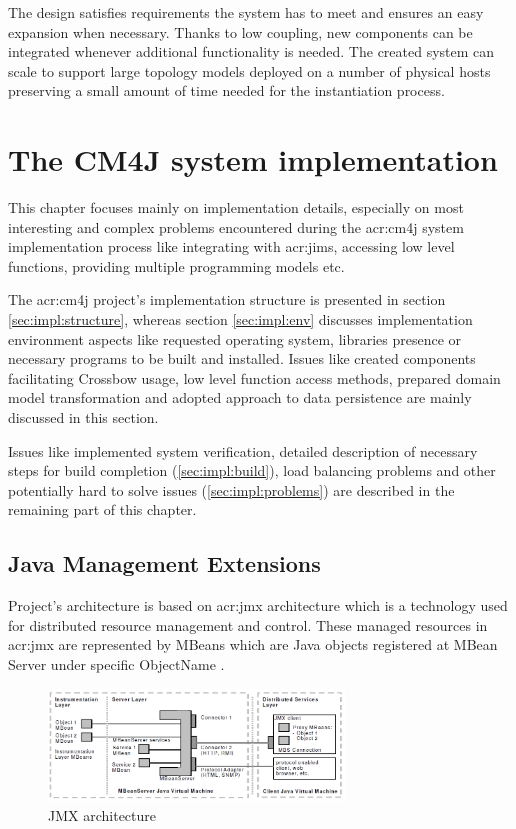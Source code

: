 \documentclass[11pt,openany]{book}
\begin{document}
      The design satisfies requirements the system has to meet and ensures an easy expansion when necessary. Thanks to
      low coupling, new components can be integrated whenever additional functionality is needed. The created system can
      scale to support large topology models deployed on a number of physical hosts preserving a small amount of time
      needed for the instantiation process.


  \chapter{The CM4J system implementation}
  \label{chap:impl}

    This chapter focuses mainly on implementation details, especially on most interesting and complex problems
    encountered during the \gls{acr:cm4j} system implementation process like integrating with \gls{acr:jims}, accessing
    low level functions, providing multiple programming models etc.

    The \gls{acr:cm4j} project's implementation structure is presented in section \ref{sec:impl:structure}, whereas
    section \ref{sec:impl:env} discusses implementation environment aspects like requested operating system, libraries
    presence or necessary programs to be built and installed. Issues like created components facilitating Crossbow
    usage, low level function access methods, prepared domain model transformation and adopted approach to data
    persistence are mainly discussed in this section.

    Issues like implemented system verification, detailed description of necessary steps for build completion
    (\ref{sec:impl:build}), load balancing problems and other potentially hard to solve issues (\ref{sec:impl:problems})
    are described in the remaining part of this chapter.


    \section{Java Management Extensions}

      Project's architecture is based on \gls{acr:jmx} architecture which is a technology used for distributed resource
      management and control. These managed resources in \gls{acr:jmx} are represented by MBeans which are Java objects
      registered at MBean Server under specific ObjectName \cite{jims}.

      \begin{figure}[h]
        \begin{center}
          \includegraphics[width=0.7\textwidth]{img/jims/jmx.png}
        \end{center}

        \caption{JMX architecture \cite{jims}}
      \end{figure}
\end{document}
